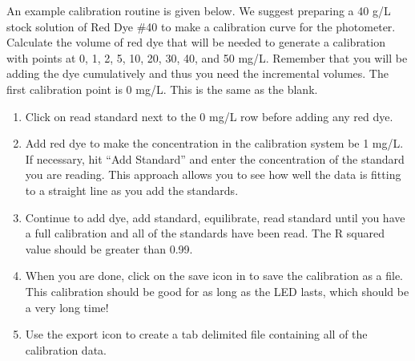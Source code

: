 \documentclass[letterpaper,10pt,english]{sphinxmanual}
\begin{document}
An example calibration routine is given below. We suggest preparing a 40 g/L stock solution of Red Dye \#40 to make a calibration curve for the photometer. Calculate the volume of red dye that will be needed to generate a calibration with points at 0, 1, 2, 5, 10, 20, 30, 40, and 50 mg/L. Remember that you will be adding the dye cumulatively and thus you need the incremental volumes. The first calibration point is 0 mg/L. This is the same as the blank.
\begin{enumerate}
\item {} 
Click on read standard next to the 0 mg/L row before adding any red dye.

\item {} 
Add red dye to make the concentration in the calibration system be 1 mg/L. If necessary, hit “Add Standard” and enter the concentration of the standard you are reading. This approach allows you to see how well the data is fitting to a straight line as you add the standards.

\item {} 
Continue to add dye, add standard, equilibrate, read standard until you have a full calibration and all of the standards have been read. The R squared value should be greater than 0.99.

\item {} 
When you are done, click on the save icon in  to save the calibration as a file. This calibration should be good for as long as the LED lasts, which should be a very long time!

\item {} 
Use the export icon to create a tab delimited file containing all of the calibration data.

\end{enumerate}
\end{document}
